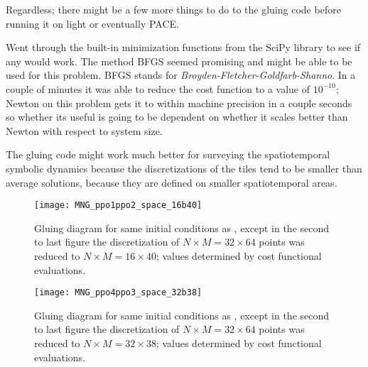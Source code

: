 \begin{description}
{\begin{description}
Regardless; there might be a few more things to do to the gluing code before running it on light or eventually PACE.

\item[Cheaptricks]
Went through the built-in minimization functions from the SciPy library to see if any would work. The method BFGS seemed promising and might
be able to be used for this problem. BFGS stands for \emph{Broyden-Fletcher-Goldfarb-Shanno}. In a couple of minutes it was able to reduce
the cost function to a value of $10^{-10}$; Newton on this problem gets it to within machine precision in a couple seconds so whether its useful
is going to be dependent on whether it scales better than Newton with respect to system size.

\item[Spatiotemporal Symbolic Dynamics]
The gluing code might work much better for surveying the spatiotemporal symbolic dynamics because
the discretizations of the tiles tend to be smaller than average solutions, because they are defined on
smaller spatiotemporal areas.

\end{description}
}

\begin{figure}
\centering
\begin{minipage}[height=.1\textheight]{.8\textwidth}
\texttt{[image: MNG\_ppo1ppo2\_space\_16b40]}
\end{minipage}
\caption{ \label{fig:MNG-ppo1plus2-space-min}
Gluing diagram for same initial conditions as , except in the second
to last figure the discretization of $N\times M = 32 \times 64$ points was reduced to
$N\times M = 16 \times 40$; values determined by cost functional evaluations.
}
\end{figure}

\begin{figure}
\centering
\begin{minipage}[height=.1\textheight]{.8\textwidth}
\texttt{[image: MNG\_ppo4ppo3\_space\_32b38]}
\end{minipage}
\caption{ \label{fig:MNG-ppo4plus3-space-min}
Gluing diagram for same initial conditions as , except in the second
to last figure the discretization of $N\times M = 32 \times 64$ points was reduced to
$N\times M = 32 \times 38$; values determined by cost functional evaluations.
}
\end{figure}


\end{description}
